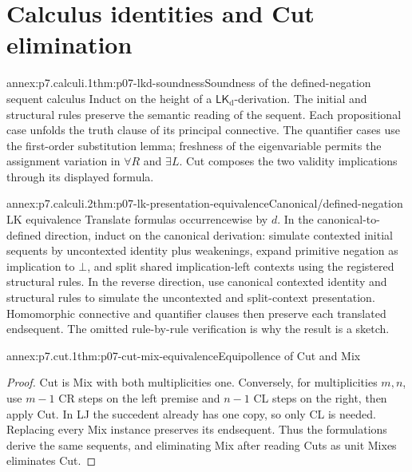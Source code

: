 
\section{Calculus identities and Cut elimination}

\begin{annexitem}{annex:p7.calculi.1}{thm:p07-lkd-soundness}{Soundness of the defined-negation sequent calculus}
Induct on the height of a
\(\mathsf{LK}_{\mathrm d}\)-derivation.  The initial and structural rules
preserve the semantic reading of the sequent.  Each propositional case unfolds
the truth clause of its principal connective.  The quantifier cases use the
first-order substitution lemma; freshness of the eigenvariable permits the
assignment variation in \(\forall R\) and \(\exists L\).  Cut composes the
two validity implications through its displayed formula.
\end{annexitem}

\begin{annexitem}{annex:p7.calculi.2}{thm:p07-lk-presentation-equivalence}{Canonical/defined-negation LK equivalence}
Translate formulas occurrencewise by \(d\).  In the canonical-to-defined
direction, induct on the canonical derivation: simulate contexted initial
sequents by uncontexted identity plus weakenings, expand primitive negation as
implication to \(\bot\), and split shared implication-left contexts using the
registered structural rules.  In the reverse direction, use canonical
contexted identity and structural rules to simulate the uncontexted and
split-context presentation.  Homomorphic connective and quantifier clauses
then preserve each translated endsequent.  The omitted rule-by-rule
verification is why the result is a sketch.
\end{annexitem}

\begin{annexitem}{annex:p7.cut.1}{thm:p07-cut-mix-equivalence}{Equipollence of Cut and Mix}
\begin{proof}
Cut is Mix with both multiplicities one.  Conversely, for multiplicities
\(m,n\), use \(m-1\) CR steps on the left premise and \(n-1\) CL steps on the
right, then apply Cut.  In LJ the succedent already has one copy, so only CL
is needed.  Replacing every Mix instance preserves its endsequent.  Thus the
formulations derive the same sequents, and eliminating Mix after reading Cuts
as unit Mixes eliminates Cut.
\end{proof}
\end{annexitem}

